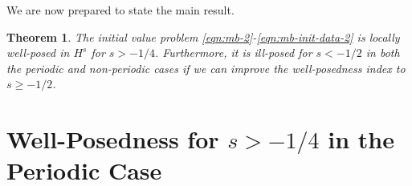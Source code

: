\documentclass[12pt,reqno]{amsart}
\numberwithin{equation}{section}  %
\newtheorem{theorem}{Theorem}[section]
\begin{document}
%
We are now prepared to state the main result.
%
%
%
%
%
%
%
%
%
%
\begin{theorem}
\label{thm:main}
The initial value problem 
\eqref{eqn:mb-2}-\eqref{eqn:mb-init-data-2} is locally well-posed in $H^s$ for
$s >
-1/4$. Furthermore, it is ill-posed for $s < -1/2$ in both the periodic and non-periodic cases if we can improve the well-posedness index to $s \ge -1/2$. 
%
%
\end{theorem} 
%
%
%
%
%
%
%
%
%
%
%
%
%
%
\section{Well-Posedness for $s > -1/4$ in the Periodic Case}
%
%
%
%
\end{document}
